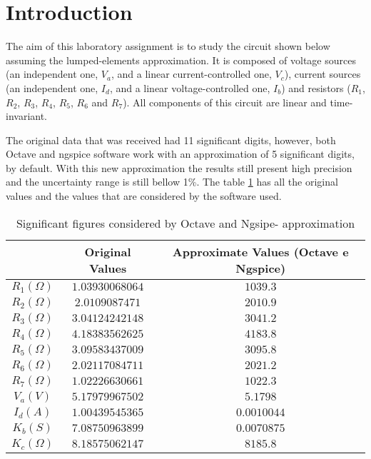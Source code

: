 \section{Introduction}
\label{sec:introduction}

\par
The aim of this laboratory assignment is to study the circuit shown below assuming the lumped-elements approximation. It is composed of voltage sources (an independent one, $V_a$, and a linear current-controlled one, $V_c$), current sources (an independent one, $I_d$, and a linear voltage-controlled one, $I_b$) and resistors ($R_1$, $R_2$, $R_3$, $R_4$, $R_5$, $R_6$ and $R_7$). All components of this circuit are linear and time-invariant.

The original data that was received had 11 significant digits, however, both Octave and ngspice software work with an approximation of 5 significant digits, by default. With this new approximation the results still present high precision and the uncertainty range is still bellow 1\%. The table \ref{tab:ap} has all the original values and the values that are considered by the software used. 

\begin{table}[hbt!]
  \centering
  \begin{tabular}{|c|c|c|}
    \hline
    &           \textbf{Original Values}        & \textbf{Approximate Values (Octave e Ngspice)}\\ \hline
    $R_1 (\Omega)$   &  $   1.03930068064   $     & $1039.3$\\ \hline
    $R_2 (\Omega)$   &  $   2.0109087471    $      & $2010.9$\\ \hline
    $R_3 (\Omega)$   &  $   3.04124242148   $    & $3041.2$\\ \hline
    $R_4 (\Omega)$   &  $   4.18383562625   $     & $4183.8$\\ \hline
    $R_5 (\Omega)$   &  $   3.09583437009   $     & $3095.8$\\ \hline
    $R_6 (\Omega)$   &  $   2.02117084711   $     & $2021.2$\\ \hline
    $R_7 (\Omega)$   &  $   1.02226630661   $     & $1022.3$\\\hline
    $V_a (V)$   &  $   5.17979967502   $     & $5.1798$\\ \hline
    $I_d (A)$   &  $    1.00439545365     $     & $0.0010044$\\ \hline
    $K_b (S)$   &  $    7.08750963899     $     & $0.0070875$\\ \hline
    $K_c (\Omega)$   &     $8.18575062147    $     & $8185.8$\\ \hline
  \end{tabular}
  \caption{Significant figures considered by Octave and Ngsipe- approximation} 
  \label{tab:ap}
\end{table}

